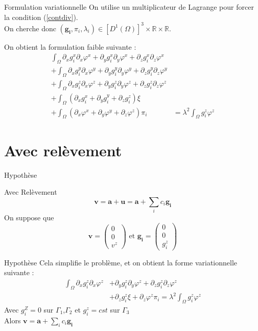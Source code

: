 \documentclass{beamer}
\begin{document}
\begin{frame}{Formulation variationnelle}
On utilise un multiplicateur de Lagrange pour forcer la condition (\ref{contdiv}).\\
On cherche donc $(\bm{g_i}, \pi_i, \lambda_i)\in [D^1(\Omega)]^3 \times \mathbb{R} \times \mathbb{R}$.
\begin{block}{On obtient la formulation faible suivante :}
\begin{align*}
\int_\Omega \partial_xg_i^x\partial_x\varphi^x + \partial_yg_i^x\partial_y\varphi^x + \partial_zg_i^x\partial_z\varphi^x&\\
+\int_\Omega \partial_xg_i^y\partial_x\varphi^y + \partial_yg_i^y\partial_y\varphi^y + \partial_zg_i^y\partial_z\varphi^y&\\
+\int_\Omega \partial_xg_i^z\partial_x\varphi^z + \partial_yg_i^z\partial_y\varphi^z + \partial_zg_i^z\partial_z\varphi^z&\\
+\int_\Omega (\partial_x g_i^x+ \partial_y g_i^y + \partial_z g_i^z)\xi&\\
+\int_\Omega (\partial_x\varphi^x + \partial_y\varphi^y + \partial_z\varphi^z)\pi_i &= \lambda^2\int_\Omega g_i^z\varphi^z
\end{align*}
\end{block}
\end{frame}

\section{Avec relèvement}
\begin{frame}{Hypothèse}
\begin{alertblock}{Avec Relèvement}
\[
\bm{v}=\bm{a}+\bm{u}=\bm{a}+\sum_i c_i\bm{g_i}
\]
On suppose que
\[
\bm{v} = \begin{pmatrix}0\\0\\v^z\end{pmatrix}\text{ et }\bm{g_i} = \begin{pmatrix}0\\0\\g_i^z\end{pmatrix}
\]

\end{alertblock}
\end{frame}

\begin{frame}{Hypothèse}
Cela simplifie le problème, et on obtient la forme variationnelle suivante :
\begin{align*}
\int_\Omega \partial_xg_i^z\partial_x\varphi^z &+ \partial_yg_i^z\partial_y\varphi^z + \partial_zg_i^z\partial_z\varphi^z\\
&+ \partial_z g_i^z\xi + \partial_z\varphi^z\pi_i = \lambda^2\int_\Omega g_i^z\varphi^z
\end{align*}
Avec $g_i^Z=0$ sur $\Gamma_1$,$\Gamma_2$ et $g_i^z=cst$ sur $\Gamma_3$\\
Alors $\bm{v}=\bm{a}+\sum_i c_i\bm{g_i}$
\end{frame}
\end{document}
